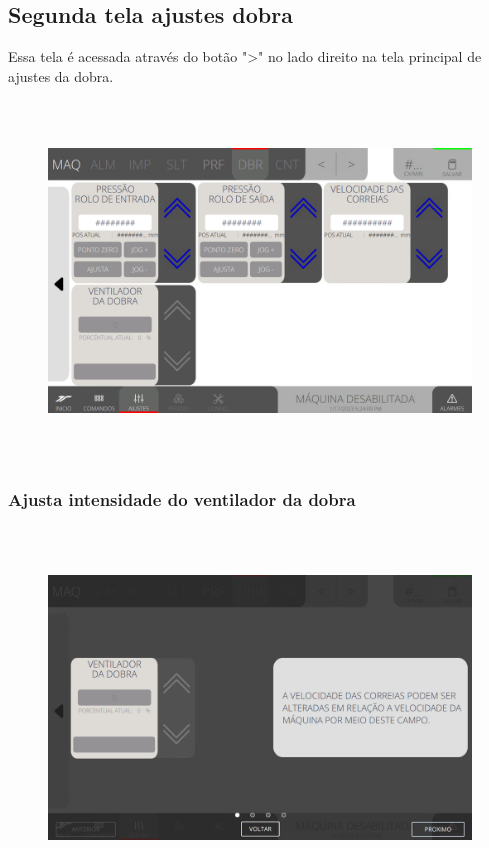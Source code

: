 \newpage
\thispagestyle{fancy}
\vspace*{40 pt}
\subsection{Segunda tela ajustes dobra}
\vspace*{\fill}
Essa tela é acessada através do botão "\textgreater" no lado direito na tela principal de ajustes da dobra.
\begin{figure}[h]
  \centering
  \includegraphics[width=576px,height=360px]{src/imagesFlexo/07-fold/settings/e-Tela-Principal-2.png}
\end{figure}
\vspace*{\fill}

\newpage
\thispagestyle{fancy}
\vspace*{40 pt}
\subsubsection{\small{Ajusta intensidade do ventilador da dobra}}
\vspace*{\fill}
\begin{figure}[h]
  \centering
  \includegraphics[width=576px,height=360px]{src/imagesFlexo/07-fold/settings/e-6.png}
\end{figure}
\vspace*{\fill}

